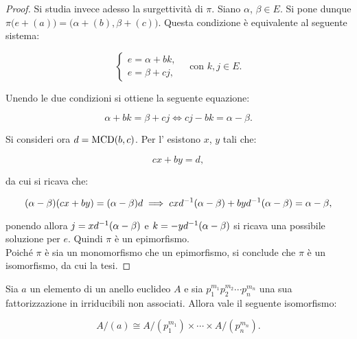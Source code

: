 \begin{proof}
        Si studia invece adesso la surgettività di $\pi$. Siano $\alpha$,
        $\beta \in E$. Si pone dunque $\pi\bigl(e + (a)\bigr) =
        \bigl(\alpha + (b), \beta + (c)\bigr)$. Questa condizione è equivalente
        al seguente sistema:
        
        \[ \begin{cases} e = \alpha + bk, \\ e = \beta + cj, \end{cases} \quad \text{con } k, j \in E. \]
        
        \vskip 0.1in
        
        Unendo le due condizioni si ottiene la seguente equazione:
        
        \[ \alpha + bk = \beta + cj \iff cj - bk = \alpha - \beta.  \]
        
        \vskip 0.1in
        
        Si consideri ora $d = \operatorname{MCD}(b, c)$. Per l' esistono
        $x$, $y$ tali che:
        
        \[ cx+by=d, \]
        
        \vskip 0.1in
        
        da cui si ricava che:
        
        \[ (\alpha-\beta)(cx + by) = (\alpha-\beta)d \implies cxd^{-1}(\alpha-\beta)+byd^{-1}(\alpha-\beta)=\alpha-\beta, \]
        
        \vskip 0.1in
        
        ponendo allora $j=xd^{-1}(\alpha-\beta)$ e $k=-yd^{-1}(\alpha-\beta)$
        si ricava una possibile soluzione per $e$. Quindi
        $\pi$ è un epimorfismo. \\
        
        Poiché $\pi$ è sia un monomorfismo che un epimorfismo, si conclude
        che $\pi$ è un isomorfismo, da cui la tesi.
        
    \end{proof}

    \begin{theorem}
        \label{th:cinese}
    
        Sia $a$ un elemento di un anello euclideo $A$ e sia
        $p_1^{m_1}p_2^{m_2}\cdots p_n^{m_n}$ una sua fattorizzazione
        in irriducibili non associati.
        Allora vale il seguente isomorfismo:
        
        \[ A/(a) \cong A/(p_1^{m_1}) \times \cdots \times A/(p_n^{m_n}). \]
    \end{theorem}
    
